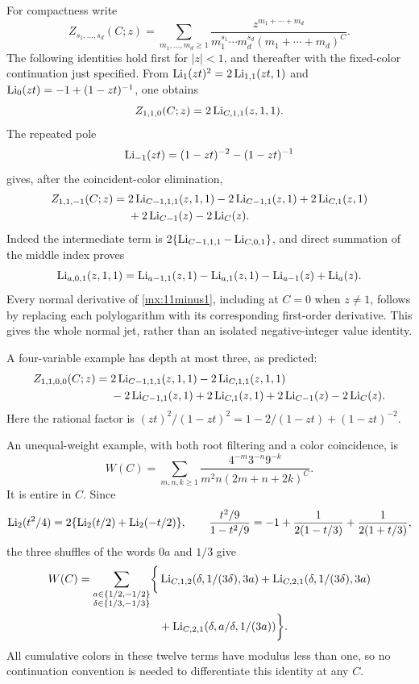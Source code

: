 \documentclass[11pt]{article}
\numberwithin{equation}{section}
\theoremstyle{definition}
\theoremstyle{remark}
\begin{document}
For compactness write
\[
 Z_{s_1,\ldots,s_d}(C;z)
  =\sum_{m_1,\ldots,m_d\geq1}
      \frac{z^{m_1+\cdots+m_d}}
       {m_1^{s_1}\cdots m_d^{s_d}(m_1+\cdots+m_d)^C}.
\]
The following identities hold first for $|z|<1$, and thereafter with
the fixed-color continuation just specified.  From
$\operatorname{Li}_1(zt)^2=2\operatorname{Li}_{1,1}(zt,1)$ and
$\operatorname{Li}_0(zt)=-1+(1-zt)^{-1}$, one obtains
\begin{equation}\label{mx:110}
 Z_{1,1,0}(C;z)=2\operatorname{Li}_{C,1,1}(z,1,1).
\end{equation}
The repeated pole
\[
 \operatorname{Li}_{-1}(zt)=(1-zt)^{-2}-(1-zt)^{-1}
\]
gives, after the coincident-color elimination,
\begin{align}\label{mx:11minus1}
 Z_{1,1,-1}(C;z)={}&2\operatorname{Li}_{C-1,1,1}(z,1,1)
                   -2\operatorname{Li}_{C-1,1}(z,1)
                   +2\operatorname{Li}_{C,1}(z,1)\notag\\
                 &+2\operatorname{Li}_{C-1}(z)-2\operatorname{Li}_C(z).
\end{align}
Indeed the intermediate term is
$2\{\operatorname{Li}_{C-1,1,1}-\operatorname{Li}_{C,0,1}\}$, and direct summation of
the middle index proves
\[
 \operatorname{Li}_{a,0,1}(z,1,1)
 =\operatorname{Li}_{a-1,1}(z,1)-\operatorname{Li}_{a,1}(z,1)
      -\operatorname{Li}_{a-1}(z)+\operatorname{Li}_a(z).
\]
Every normal derivative of \eqref{mx:11minus1}, including at $C=0$
when $z\ne1$, follows by replacing each polylogarithm with its
corresponding first-order derivative.  This gives the whole normal
jet, rather than an isolated negative-integer value identity.

A four-variable example has depth at most three, as predicted:
\begin{align}\label{mx:1100}
 Z_{1,1,0,0}(C;z)={}&2\operatorname{Li}_{C-1,1,1}(z,1,1)
                    -2\operatorname{Li}_{C,1,1}(z,1,1)\notag\\
                  &-2\operatorname{Li}_{C-1,1}(z,1)
                    +2\operatorname{Li}_{C,1}(z,1)
                    +2\operatorname{Li}_{C-1}(z)-2\operatorname{Li}_C(z).
\end{align}
Here the rational factor is
$(zt)^2/(1-zt)^2=1-2/(1-zt)+(1-zt)^{-2}$.

An unequal-weight example, with both root filtering and a color
coincidence, is
\begin{equation}\label{mx:weightedexample}
 W(C)=\sum_{m,n,k\geq1}
       \frac{4^{-m}3^{-n}9^{-k}}{m^2n(2m+n+2k)^C}.
\end{equation}
It is entire in $C$.  Since
\[
 \operatorname{Li}_2(t^2/4)=2\{\operatorname{Li}_2(t/2)+\operatorname{Li}_2(-t/2)\},\qquad
 \frac{t^2/9}{1-t^2/9}
   =-1+\frac1{2(1-t/3)}+\frac1{2(1+t/3)},
\]
the three shuffles of the words $0a$ and $1/3$ give
\begin{align}\label{mx:weightedanswer}
 W(C)=\sum_{\substack{a\in\{1/2,-1/2\}\\
                     \delta\in\{1/3,-1/3\}}}
 \biggl\{&\operatorname{Li}_{C,1,2}(\delta,1/(3\delta),3a)
       +\operatorname{Li}_{C,2,1}(\delta,1/(3\delta),3a)\notag\\
       &+\operatorname{Li}_{C,2,1}(\delta,a/\delta,1/(3a))\biggr\}.
\end{align}
All cumulative colors in these twelve terms have modulus less than
one, so no continuation convention is needed to differentiate this
identity at any $C$.
\end{document}
